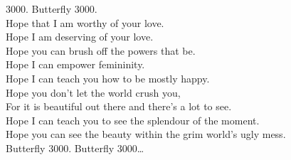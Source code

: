 

 3000. Butterfly 3000. \\

Hope that I am worthy of your love. \\
Hope I am deserving of your love. \\
Hope you can brush off the powers that be. \\
Hope I can empower femininity. \\
Hope I can teach you how to be mostly happy. \\
Hope you don't let the world crush you, \\
For it is beautiful out there and there's a lot to see. \\
Hope I can teach you to see the splendour of the moment. \\
Hope you can see the beauty within the grim world's ugly mess. \\

Butterfly 3000. Butterfly 3000… \\
